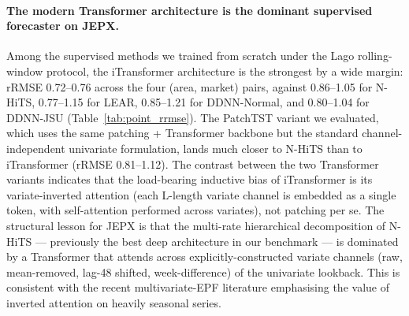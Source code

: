 \documentclass[review,3p,times,authoryear]{elsarticle}
\begin{document}
\paragraph{The modern Transformer architecture is the dominant supervised forecaster on JEPX.}
Among the supervised methods we trained from scratch under the Lago rolling-window protocol, the iTransformer architecture \citep{liu2024itransformer} is the strongest by a wide margin: rRMSE 0.72--0.76 across the four (area, market) pairs, against 0.86--1.05 for N-HiTS, 0.77--1.15 for LEAR, 0.85--1.21 for DDNN-Normal, and 0.80--1.04 for DDNN-JSU (Table~\ref{tab:point_rrmse}). The PatchTST variant we evaluated, which uses the same patching + Transformer backbone but the standard channel-independent univariate formulation, lands much closer to N-HiTS than to iTransformer (rRMSE 0.81--1.12). The contrast between the two Transformer variants indicates that the load-bearing inductive bias of iTransformer is its variate-inverted attention (each L-length variate channel is embedded as a single token, with self-attention performed across variates), not patching per se. The structural lesson for JEPX is that the multi-rate hierarchical decomposition of N-HiTS --- previously the best deep architecture in our benchmark --- is dominated by a Transformer that attends across explicitly-constructed variate channels (raw, mean-removed, lag-48 shifted, week-difference) of the univariate lookback. This is consistent with the recent multivariate-EPF literature emphasising the value of inverted attention on heavily seasonal series.
\end{document}
